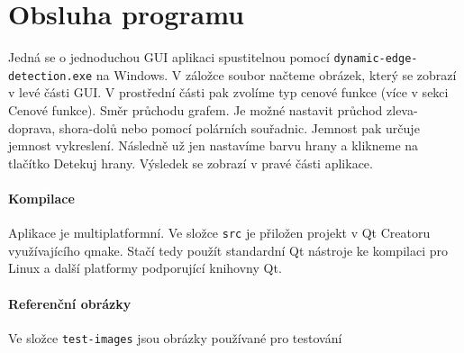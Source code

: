 \documentclass[12pt,a4paper,titlepage,final]{report}
\begin{document}
\section{Obsluha programu}

Jedná se o jednoduchou GUI aplikaci spustitelnou pomocí \verb|dynamic-edge-detection.exe| na Windows. V záložce soubor načteme obrázek, který se zobrazí v levé části GUI. V prostřední části pak zvolíme typ cenové funkce (více v sekci Cenové funkce). Směr průchodu grafem. Je možné nastavit průchod zleva-doprava, shora-dolů nebo pomocí polárních souřadnic. Jemnost pak určuje jemnost vykreslení. Následně už jen nastavíme barvu hrany a klikneme na tlačítko Detekuj hrany. Výsledek se zobrazí v pravé části aplikace.

\paragraph{Kompilace} Aplikace je multiplatformní. Ve složce \verb|src| je přiložen projekt v Qt Creatoru využívajícího qmake. Stačí tedy použít standardní Qt nástroje ke kompilaci pro Linux a další platformy podporující knihovny Qt.

\paragraph{Referenční obrázky} Ve složce \verb|test-images| jsou obrázky používané pro testování



\nocite{cite1}
\nocite{cite2}
\nocite{cite3}
\nocite{cite4}
\nocite{cite5}

\hypertarget{bib}{}

\end{document}

